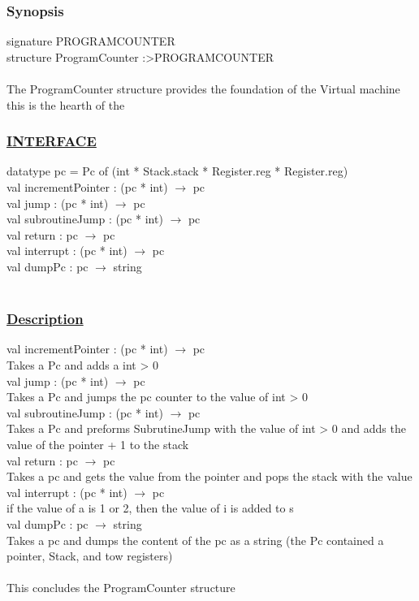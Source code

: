 \documentclass[a4paper]{article}
\begin{document}
\subsubsection{Synopsis}
signature PROGRAM\textunderscore COUNTER\\
structure ProgramCounter :\textgreater PROGRAM\textunderscore COUNTER\\
\\
The ProgramCounter structure provides the foundation of the Virtual machine this is the hearth of the 
\\
\subsubsection{\uline{INTERFACE}}
	datatype pc = Pc of (int * Stack.stack * Register.reg * Register.reg)
\\
	val incrementPointer : (pc * int) $\rightarrow$ pc\\
	val jump : (pc * int) $\rightarrow$ pc\\
	val subroutineJump : (pc * int) $\rightarrow$ pc\\ 						
	val return : pc $\rightarrow$ pc\\	
    val interrupt : (pc * int) $\rightarrow$ pc\\
    val dumpPc : pc $\rightarrow$ string\\
\\
\subsubsection{\uline{Description}}
	val incrementPointer : (pc * int) $\rightarrow$ pc\\
		Takes a Pc and adds a int > 0\\							
	val jump : (pc * int) $\rightarrow$ pc\\
		Takes a Pc and jumps the pc counter to the value of int > 0\\
	val subroutineJump : (pc * int) $\rightarrow$ pc\\
		Takes a Pc and preforms SubrutineJump with the value of  int > 0 and adds the  value of the pointer + 1 to the stack\\						
	val return : pc $\rightarrow$ pc\\
    	Takes a pc and gets the value from the pointer and pops the stack with the value\\
	val interrupt : (pc * int) $\rightarrow$ pc\\							
		if the value of a is 1 or 2, then the value of i is added to s\\
	val dumpPc : pc $\rightarrow$ string\\
		Takes a pc and dumps the content of the pc as a string (the Pc contained a pointer, Stack, and tow registers)\\
\\
This concludes the ProgramCounter structure
\\
\end{document}
